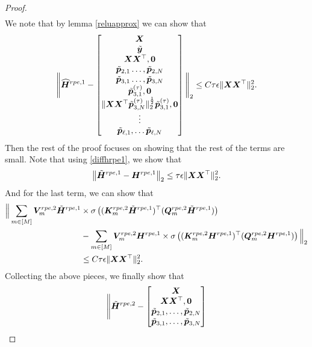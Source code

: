 \begin{proof}
\begin{align*}
        \end{align*}
    We note that by lemma \ref{reluapprox} we can show that
    \begin{align*}
        \Bigg\Vert\widehat{\boldsymbol{H}}^{rpe,1}-\begin{bmatrix}
            \boldsymbol{X}\\
            \tilde{\boldsymbol{y}}\\
            \boldsymbol{X}\boldsymbol{X}^\top,\boldsymbol{0}\\
            \tilde{\boldsymbol{p}}_{2,1}\ldots,\tilde{\boldsymbol{p}}_{2,N}\\
            \tilde{\boldsymbol{p}}_{3,1}\ldots,\tilde{\boldsymbol{p}}_{3,N}\\
            \tilde{\boldsymbol{p}}_{3,1}^{(\tau)},\boldsymbol{0}\\
            \Vert\boldsymbol{X}\boldsymbol{X}^\top\tilde{\boldsymbol{p}}_{3,N}^{(\tau)}\Vert_2^{\frac{1}{2}}\tilde{\boldsymbol{p}}_{3,1}^{(\tau)},\boldsymbol{0}\\
            \vdots\\
            \tilde{\boldsymbol{p}}_{\ell,1},\ldots\tilde{\boldsymbol{p}}_{\ell, N}
        \end{bmatrix}\Bigg\Vert_2\leq C\tau\epsilon\Vert\boldsymbol{X}\boldsymbol{X}^\top\Vert_2^2.
    \end{align*}
    Then the rest of the proof focuses on showing that the rest of the terms are small. Note that using \eqref{diffhrpe1}, we show that
    \begin{align*}
        \left\Vert\tilde{\boldsymbol{H}}^{rpe,1}-\boldsymbol{H}^{rpe,1}\right\Vert_2\leq\tau\epsilon\Vert\boldsymbol{X}\boldsymbol{X}^\top\Vert_2^2.
    \end{align*}
    And for the last term, we can show that
    \begin{align*}
        \Big\Vert\sum_{m\in[M]}\boldsymbol{V}_m^{rpe,2}\tilde{\boldsymbol{H}}^{rpe,1}&\times\sigma\left((\boldsymbol{K}_m^{rpe,2}\tilde{\boldsymbol{H}}^{rpe,1})^\top(\boldsymbol{Q}_m^{rpe,2}\tilde{\boldsymbol{H}}^{rpe,1})\right)\\
        &-\sum_{m\in[M]}\boldsymbol{V}_m^{rpe,2}\boldsymbol{H}^{rpe,1}\times\sigma\left((\boldsymbol{K}_m^{rpe,2}\boldsymbol{H}^{rpe,1})^\top(\boldsymbol{Q}_m^{rpe,2}\boldsymbol{H}^{rpe,1})\right)\Big\Vert_2\\
        &\leq C\tau\epsilon\Vert\boldsymbol{X}\boldsymbol{X}^\top\Vert_2^2. 
    \end{align*}
    Collecting the above pieces, we finally show that
    \begin{align*}
        \Bigg\Vert\tilde{\boldsymbol{H}}^{rpe,2}-\begin{bmatrix}
            \boldsymbol{X}\\
            \boldsymbol{X}\boldsymbol{X}^\top,\boldsymbol{0}\\
            \tilde{\boldsymbol{p}}_{2,1},\ldots,\tilde{\boldsymbol{p}}_{2,N}\\
            \tilde{\boldsymbol{p}}_{3,1},\ldots,\tilde{\boldsymbol{p}}_{3,N}\\

\end{bmatrix}
\end{align*}
\end{proof}
